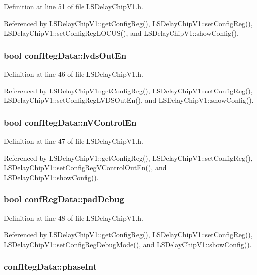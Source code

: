 Definition at line 51 of file LSDelayChipV1.h.

Referenced by LSDelayChipV1::getConfigReg(), LSDelayChipV1::setConfigReg(), LSDelayChipV1::setConfigRegLOCUS(), and LSDelayChipV1::showConfig().\hypertarget{structconfRegData_a709d8d691ef0c8ea5c4c03aac3d851f1}{
\subsubsection[{lvdsOutEn}]{\setlength{\rightskip}{0pt plus 5cm}bool {\bf confRegData::lvdsOutEn}}}
\label{structconfRegData_a709d8d691ef0c8ea5c4c03aac3d851f1}


Definition at line 46 of file LSDelayChipV1.h.

Referenced by LSDelayChipV1::getConfigReg(), LSDelayChipV1::setConfigReg(), LSDelayChipV1::setConfigRegLVDSOutEn(), and LSDelayChipV1::showConfig().\hypertarget{structconfRegData_a62f72429bde3ede255f6d8dfe1401c37}{
\subsubsection[{nVControlEn}]{\setlength{\rightskip}{0pt plus 5cm}bool {\bf confRegData::nVControlEn}}}
\label{structconfRegData_a62f72429bde3ede255f6d8dfe1401c37}


Definition at line 47 of file LSDelayChipV1.h.

Referenced by LSDelayChipV1::getConfigReg(), LSDelayChipV1::setConfigReg(), LSDelayChipV1::setConfigRegVControlOutEn(), and LSDelayChipV1::showConfig().\hypertarget{structconfRegData_a4e98d082c44e34995224bd242da493d0}{
\subsubsection[{padDebug}]{\setlength{\rightskip}{0pt plus 5cm}bool {\bf confRegData::padDebug}}}
\label{structconfRegData_a4e98d082c44e34995224bd242da493d0}


Definition at line 48 of file LSDelayChipV1.h.

Referenced by LSDelayChipV1::getConfigReg(), LSDelayChipV1::setConfigReg(), LSDelayChipV1::setConfigRegDebugMode(), and LSDelayChipV1::showConfig().\hypertarget{structconfRegData_aee4fd08aceaaf19fcb8edfe8aa50f5ab}{
\subsubsection[{phaseInt}]{ {\bf confRegData::phaseInt}}}
\label{structconfRegData_aee4fd08aceaaf19fcb8edfe8aa50f5ab}


